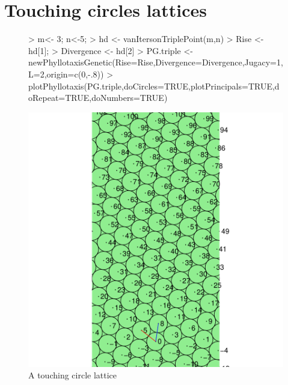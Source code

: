 \documentclass[a4paper]{article}
\begin{document}







\section{Touching circles lattices }

\begin{center}
\begin{figure}[H]
\begin{Schunk}
\begin{Sinput}
> m<- 3; n<-5;
> hd <- vanItersonTriplePoint(m,n)
> Rise <- hd[1];
> Divergence <- hd[2]
> PG.triple <- newPhyllotaxisGenetic(Rise=Rise,Divergence=Divergence,Jugacy=1,L=2,origin=c(0,-.8))
> plotPhyllotaxis(PG.triple,doCircles=TRUE,plotPrincipals=TRUE,doRepeat=TRUE,doNumbers=TRUE)
\end{Sinput}
\end{Schunk}
\includegraphics{figdir/cp-plotPGxt}
\caption{A touching circle lattice}
\end{figure}
\end{center}
\end{document}
